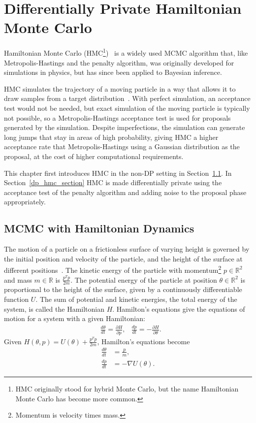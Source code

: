 \documentclass[english,twoside,openright]{HYgraduMLDS}
\newcommand{\R}{\mathbb{R}}
\begin{document}
\chapter{Differentially Private Hamiltonian Monte Carlo}\label{hmc_chapter}

Hamiltonian Monte Carlo (HMC\footnote{
    HMC originally stood for hybrid Monte Carlo, 
    but the name Hamiltonian Monte Carlo has become more common.
})~\cite{DKP87, neal2012mcmc} is a widely used MCMC algorithm that, like
Metropolis-Hastings and the penalty algorithm, was originally developed 
for simulations in physics, but has since been applied to
Bayesian inference. 

HMC simulates the trajectory of a moving particle in a way 
that allows it to draw samples from a target distribution~\cite{neal2012mcmc}. 
With perfect simulation,
an acceptance test would not be needed, but exact simulation of the moving particle 
is typically not possible, so a Metropolis-Hastings acceptance test is used
for proposals generated by the simulation. Despite imperfections, the simulation can generate long jumps
that stay in areas of high probability, giving HMC a higher acceptance rate 
that Metropolis-Hastings using a Gaussian distribution as the proposal, at the 
cost of higher computational requirements.

This chapter first introduces HMC in the non-DP setting in Section~\ref{hmc_basics_section}.
In Section~\ref{dp_hmc_section} HMC is made differentially private using the
acceptance test of the penalty algorithm and adding noise to the proposal phase 
appropriately.

\section{MCMC with Hamiltonian Dynamics}\label{hmc_basics_section}

The motion of a particle on a frictionless surface of varying height is governed 
by the initial position and velocity of the particle, and the height of the 
surface at different positions~\cite{neal2012mcmc}. 
The kinetic energy of the particle with 
momentum\footnote{Momentum is velocity times mass.}
\(p \in \R^{2}\) and mass \(m \in \R\) is \(\frac{p^{T}p}{2m}\). The potential energy of the particle
at position \(\theta \in \R^{2}\) is proportional to the height of the surface, given by
a continuously differentiable function \(U\).
The sum of potential and kinetic energies, the total 
energy of the system, is called the Hamiltonian \(H\). Hamilton's equations 
give the equations of motion for a system with a given Hamiltonian:
\begin{align*}
    &\frac{d\theta}{dt} = \frac{\partial H}{\partial p},
    &\frac{dp}{dt} = -\frac{\partial H}{\partial \theta}.
\end{align*}
Given \(H(\theta, p) = U(\theta) + \frac{p^{T}p}{2m}\), Hamilton's equations become
\begin{align*}
    \frac{d\theta}{dt} &= \frac{p}{m}, \\
    \frac{dp}{dt} &= -\nabla U(\theta).
\end{align*}
\end{document}
